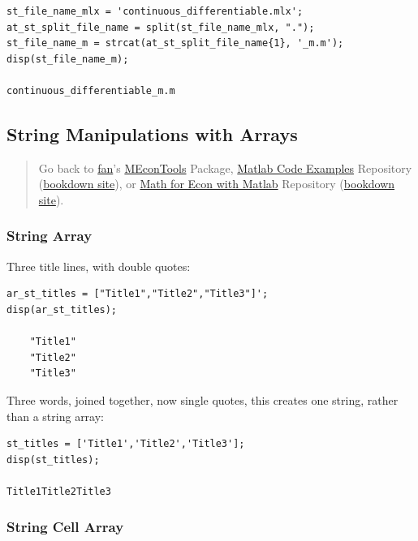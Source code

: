 \documentclass[
]{book}
\begin{document}
\begin{verbatim}
st_file_name_mlx = 'continuous_differentiable.mlx';
at_st_split_file_name = split(st_file_name_mlx, ".");
st_file_name_m = strcat(at_st_split_file_name{1}, '_m.m');
disp(st_file_name_m);

continuous_differentiable_m.m
\end{verbatim}

\hypertarget{string-manipulations-with-arrays}{%
\subsection{String Manipulations with Arrays}\label{string-manipulations-with-arrays}}

\begin{quote}
Go back to \href{http://fanwangecon.github.io/}{fan}'s \href{https://fanwangecon.github.io/MEconTools/}{MEconTools} Package, \href{https://fanwangecon.github.io/M4Econ/}{Matlab Code Examples} Repository (\href{https://fanwangecon.github.io/M4Econ/bookdown}{bookdown site}), or \href{https://fanwangecon.github.io/Math4Econ/}{Math for Econ with Matlab} Repository (\href{https://fanwangecon.github.io/Math4Econ/bookdown}{bookdown site}).
\end{quote}

\hypertarget{string-array}{%
\subsubsection{String Array}\label{string-array}}

Three title lines, with double quotes:

\begin{verbatim}
ar_st_titles = ["Title1","Title2","Title3"]';
disp(ar_st_titles);

    "Title1"
    "Title2"
    "Title3"
\end{verbatim}

Three words, joined together, now single quotes, this creates one
string, rather than a string array:

\begin{verbatim}
st_titles = ['Title1','Title2','Title3'];
disp(st_titles);

Title1Title2Title3
\end{verbatim}

\hypertarget{string-cell-array}{%
\subsubsection{String Cell Array}\label{string-cell-array}}
\end{document}
